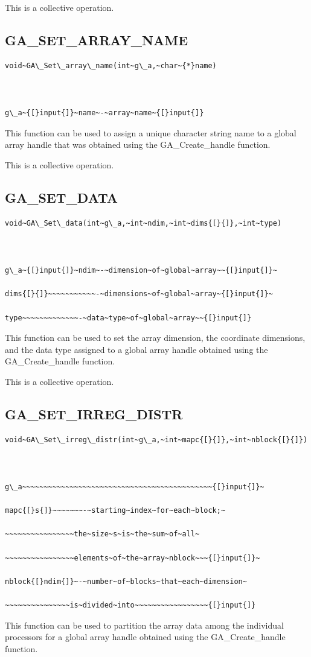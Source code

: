 This is a collective operation. 


\subsection*{\label{sub:GA_SET_ARRAY_NAME}GA\_SET\_ARRAY\_NAME}
\begin{verbatim}
void~GA\_Set\_array\_name(int~g\_a,~char~{*}name)



g\_a~{[}input{]}~name~-~array~name~{[}input{]}
\end{verbatim}
This function can be used to assign a unique character string name
to a global array handle that was obtained using the GA\_Create\_handle
function.

This is a collective operation. 


\subsection*{\label{sub:GA_SET_DATA}GA\_SET\_DATA}
\begin{verbatim}
void~GA\_Set\_data(int~g\_a,~int~ndim,~int~dims{[}{]},~int~type)



g\_a~{[}input{]}~ndim~-~dimension~of~global~array~~{[}input{]}~

dims{[}{]}~~~~~~~~~~~-~dimensions~of~global~array~{[}input{]}~

type~~~~~~~~~~~~~-~data~type~of~global~array~~{[}input{]}
\end{verbatim}
This function can be used to set the array dimension, the coordinate
dimensions, and the data type assigned to a global array handle obtained
using the GA\_Create\_handle function.

This is a collective operation. 


\subsection*{\label{sub:GA_SET_IRREG_DISTR}GA\_SET\_IRREG\_DISTR}
\begin{verbatim}
void~GA\_Set\_irreg\_distr(int~g\_a,~int~mapc{[}{]},~int~nblock{[}{]})



g\_a~~~~~~~~~~~~~~~~~~~~~~~~~~~~~~~~~~~~~~~~~~~~{[}input{]}~

mapc{[}s{]}~~~~~~~-~starting~index~for~each~block;~

~~~~~~~~~~~~~~~~the~size~s~is~the~sum~of~all~

~~~~~~~~~~~~~~~~elements~of~the~array~nblock~~~{[}input{]}~

nblock{[}ndim{]}~-~number~of~blocks~that~each~dimension~

~~~~~~~~~~~~~~~is~divided~into~~~~~~~~~~~~~~~~~{[}input{]}
\end{verbatim}
This function can be used to partition the array data among the individual
processors for a global array handle obtained using the GA\_Create\_handle
function.

